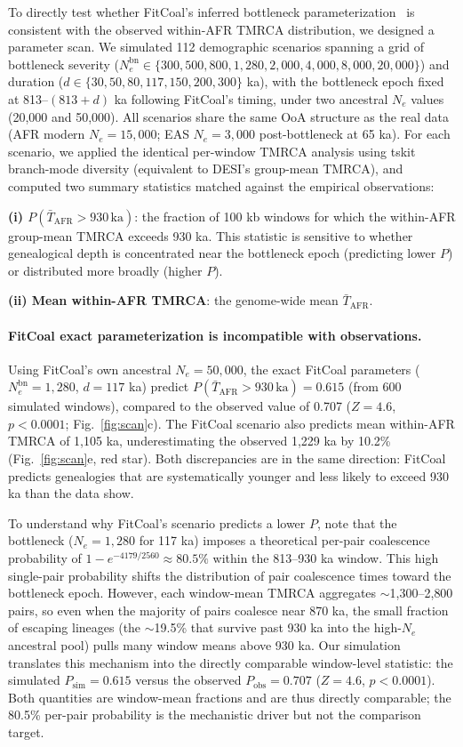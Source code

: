 To directly test whether FitCoal's inferred bottleneck parameterization~\citep{Hu2023} is consistent with the observed within-AFR TMRCA distribution, we designed a parameter scan. We simulated 112 demographic scenarios spanning a grid of bottleneck severity ($N_e^{\text{bn}} \in \{300, 500, 800, 1{,}280, 2{,}000, 4{,}000, 8{,}000, 20{,}000\}$) and duration ($d \in \{30, 50, 80, 117, 150, 200, 300\}$ ka), with the bottleneck epoch fixed at 813--$(813 + d)$ ka following FitCoal's timing, under two ancestral $N_e$ values (20,000 and 50,000). All scenarios share the same OoA structure as the real data (AFR modern $N_e = 15{,}000$; EAS $N_e = 3{,}000$ post-bottleneck at 65 ka). For each scenario, we applied the identical per-window TMRCA analysis using tskit branch-mode diversity (equivalent to DESI's group-mean TMRCA), and computed two summary statistics matched against the empirical observations:

\textbf{(i) $P(\bar{T}_\text{AFR} > 930\,\text{ka})$}: the fraction of 100 kb windows for which the within-AFR group-mean TMRCA exceeds 930 ka. This statistic is sensitive to whether genealogical depth is concentrated near the bottleneck epoch (predicting lower $P$) or distributed more broadly (higher $P$).

\textbf{(ii) Mean within-AFR TMRCA}: the genome-wide mean $\bar{T}_\text{AFR}$.

\paragraph{FitCoal exact parameterization is incompatible with observations.}
Using FitCoal's own ancestral $N_e = 50{,}000$, the exact FitCoal parameters ($N_e^{\text{bn}} = 1{,}280$, $d = 117$ ka) predict $P(\bar{T}_\text{AFR} > 930\,\text{ka}) = 0.615$ (from 600 simulated windows), compared to the observed value of 0.707 ($Z = 4.6$, $p < 0.0001$; Fig.~\ref{fig:scan}c). The FitCoal scenario also predicts mean within-AFR TMRCA of 1,105 ka, underestimating the observed 1,229 ka by 10.2\% (Fig.~\ref{fig:scan}e, red star). Both discrepancies are in the same direction: FitCoal predicts genealogies that are systematically younger and less likely to exceed 930 ka than the data show. 

To understand why FitCoal's scenario predicts a lower $P$, note that the bottleneck ($N_e = 1{,}280$ for 117 ka) imposes a theoretical per-pair coalescence probability of $1 - e^{-4179/2560} \approx 80.5\%$ within the 813--930 ka window. This high single-pair probability shifts the distribution of pair coalescence times toward the bottleneck epoch. However, each window-mean TMRCA aggregates $\sim$1{,}300--2{,}800 pairs, so even when the majority of pairs coalesce near 870 ka, the small fraction of escaping lineages (the $\sim$19.5\% that survive past 930 ka into the high-$N_e$ ancestral pool) pulls many window means above 930 ka. Our simulation translates this mechanism into the directly comparable window-level statistic: the simulated $P_\text{sim} = 0.615$ versus the observed $P_\text{obs} = 0.707$ ($Z = 4.6$, $p < 0.0001$). Both quantities are window-mean fractions and are thus directly comparable; the 80.5\% per-pair probability is the mechanistic driver but not the comparison target.


